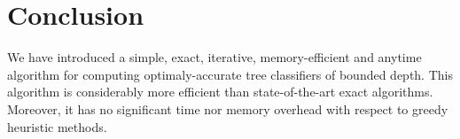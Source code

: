 \documentclass{article}
\begin{document}
%
%
%
%
% 



\section{Conclusion}

We have introduced a simple, exact, iterative, memory-efficient and anytime algorithm for computing optimaly-accurate tree classifiers of bounded depth.
This algorithm is considerably more efficient than state-of-the-art exact algorithms. Moreover, it has no significant time nor memory overhead with respect to greedy heuristic methods.
\end{document}
